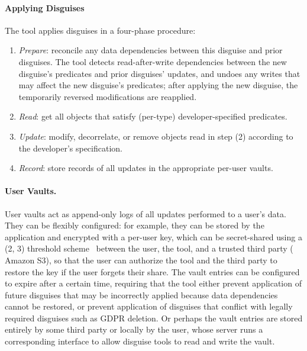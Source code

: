 \paragraph{Applying Disguises}
The tool applies disguises in a four-phase procedure:
\begin{enumerate}
    \item \emph{Prepare}: reconcile any data dependencies between this disguise and prior disguises.
            The tool detects read-after-write dependencies between the new disguise's predicates and prior disguises'
            updates, and undoes any writes that may affect the new disguise's predicates; after
            applying the new disguise, the temporarily reversed modifications are reapplied.
        \item \emph{Read}: get all objects that satisfy (per-type) developer-specified predicates.
        \item \emph{Update}: modify, decorrelate, or remove objects read in step (2) according to the
        developer's specification.
    \item \emph{Record}: store records of all updates in the appropriate per-user vaults.
\end{enumerate}

\paragraph{User Vaults.}
User vaults act as append-only logs of all updates performed to a user's data.
They can be flexibly configured: for example, they can be stored by the application and
encrypted with a per-user key, which can be secret-shared using a (2, 3)
threshold scheme~\cite{secretsharing} between the user, the tool, and a trusted third party (\eg
Amazon S3), so that the user can authorize the tool and the third party to restore the key if
the user forgets their share. The vault entries can be configured to expire after a certain
time, requiring that the tool either prevent application of future disguises that may be incorrectly
applied because data dependencies cannot be restored, or prevent application of disguises that
conflict with legally required disguises such as GDPR deletion.
Or perhaps the vault entries are stored entirely by some third party or locally by the user, whose
server runs a corresponding interface to allow disguise tools to read and write the vault.

